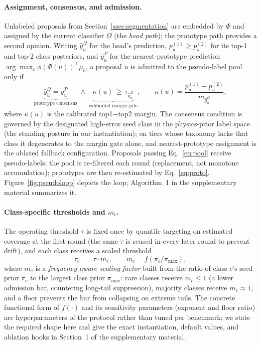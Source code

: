 \paragraph{Assignment, consensus, and admission.}
Unlabeled proposals from Section~\ref{ssec:segmentation} are embedded by $\Phi$ and assigned by the current classifier $\Omega$ (the \emph{head path}); the prototype path provides a second opinion. Writing $\hat{y}_u^{\Omega}$ for the head's prediction, $p^{(1)}_u \geq p^{(2)}_u$ for its top-1 and top-2 class posteriors, and $\hat{y}_u^{P}$ for the nearest-prototype prediction $\arg\max_c \phi(\Phi(u))^{\top} \mu_c$, a proposal $u$ is admitted to the pseudo-label pool only if
\begin{equation}\label{eq:pool}
\underbrace{\hat{y}_u^{\Omega} = \hat{y}_u^{P}}_{\text{prototype consensus}} \;\wedge\; \underbrace{\kappa(u) \,\geq\, \tau_{\hat{y}_u^{\Omega}}}_{\text{calibrated margin gate}}, \qquad \kappa(u) = \frac{p^{(1)}_u - p^{(2)}_u}{m_{\hat{y}_u^{\Omega}}},
\end{equation}
where $\kappa(u)$ is the calibrated top1$-$top2 margin. The consensus condition is governed by the designated high-error seed class in the physics-prior label space (the standing posture in our instantiation); on tiers whose taxonomy lacks that class it degenerates to the margin gate alone, and nearest-prototype assignment is the ablated fallback configuration. Proposals passing Eq.~\eqref{eq:pool} receive pseudo-labels; the pool is re-filtered each round (replacement, not monotone accumulation); prototypes are then re-estimated by Eq.~\eqref{eq:proto}. Figure~\ref{fig:pseudoloop} depicts the loop; Algorithm~1 in the supplementary material summarizes it.

\paragraph{Class-specific thresholds and $m_c$.}
The operating threshold $\tau$ is fixed once by quantile targeting on estimated coverage at the first round (the same $\tau$ is reused in every later round to prevent drift), and each class receives a scaled threshold
\begin{equation}\label{eq:mc}
\tau_c \;=\; \tau \cdot m_c, \qquad m_c = f\!\left(\pi_c / \pi_{\max}\right),
\end{equation}
where $m_c$ is a \emph{frequency-aware scaling factor} built from the ratio of class $c$'s seed prior $\pi_c$ to the largest class prior $\pi_{\max}$: rare classes receive $m_c \leq 1$ (a lower admission bar, countering long-tail suppression), majority classes receive $m_c \approx 1$, and a floor prevents the bar from collapsing on extreme tails. The concrete functional form of $f(\cdot)$ and its sensitivity parameters (exponent and floor ratio) are hyperparameters of the protocol rather than tuned per benchmark; we state the required shape here and give the exact instantiation, default values, and ablation hooks in Section~1 of the supplementary material.


